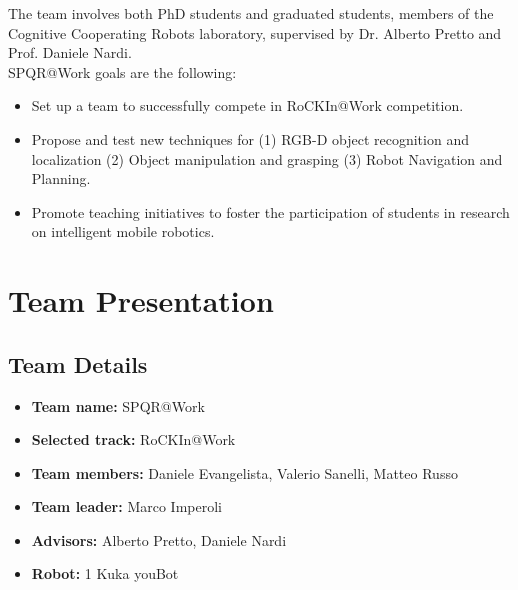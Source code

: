 \documentclass[conference]{IEEEtran}
\begin{document}
The team involves both PhD students and graduated students, members of the Cognitive Cooperating Robots laboratory, supervised by Dr. Alberto Pretto and Prof. Daniele Nardi.\\ 

SPQR@Work goals are the following:
\begin{itemize}
 \item Set up a team to successfully compete in RoCKIn@Work competition.
 \item Propose and test new techniques for (1) RGB-D object recognition and localization (2) Object manipulation and grasping (3) Robot Navigation and Planning.
 \item Promote teaching initiatives to foster the participation of students in research on intelligent mobile robotics.
\end{itemize}
 
\section{Team Presentation}
\subsection{Team Details}

\begin{itemize}
 \item \textbf{Team name:} SPQR@Work
 \item \textbf{Selected track:} RoCKIn@Work
 \item \textbf{Team members:} Daniele Evangelista, Valerio Sanelli, Matteo Russo
  \item \textbf{Team leader:} Marco Imperoli
 \item \textbf{Advisors:} Alberto Pretto, Daniele Nardi
 \item \textbf{Robot:} 1 Kuka youBot
\end{itemize}
\end{document}
